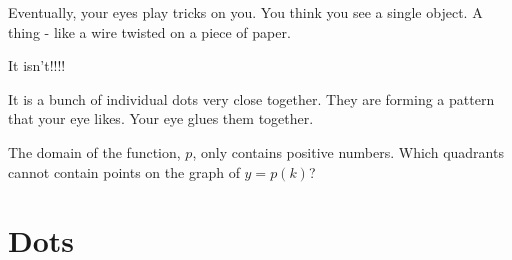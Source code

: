 \documentclass{ximera}
\begin{document}
Eventually, your eyes play tricks on you.  You think you see a single object.  A thing - like a wire twisted on a piece of paper.



\begin{image}
\end{image}



\begin{center}
\large{It isn't!!!!}  
\end{center}




It is a bunch of individual dots very close together. They are forming a pattern that your eye likes. Your eye glues them together.  





\begin{question}
The domain of the function, $p$, only contains positive numbers.  Which quadrants cannot contain points on the graph of $y=p(k)$?

\begin{selectAll}
\end{selectAll}

\end{question}




















\section{Dots}
\end{document}
